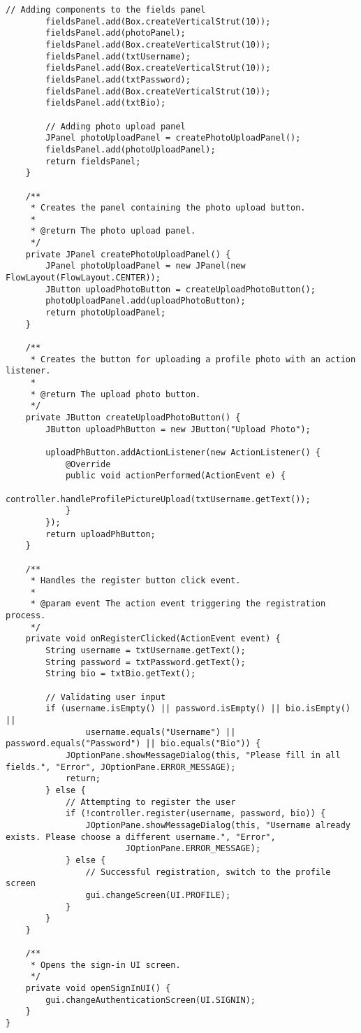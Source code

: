 \begin{lstlisting}[style=JavaStyle, caption={SignUpUI Class}, label={lst:SignUpUI-codesnippet}]
        // Adding components to the fields panel
        fieldsPanel.add(Box.createVerticalStrut(10));
        fieldsPanel.add(photoPanel);
        fieldsPanel.add(Box.createVerticalStrut(10));
        fieldsPanel.add(txtUsername);
        fieldsPanel.add(Box.createVerticalStrut(10));
        fieldsPanel.add(txtPassword);
        fieldsPanel.add(Box.createVerticalStrut(10));
        fieldsPanel.add(txtBio);

        // Adding photo upload panel
        JPanel photoUploadPanel = createPhotoUploadPanel();
        fieldsPanel.add(photoUploadPanel);
        return fieldsPanel;
    }

    /**
     * Creates the panel containing the photo upload button.
     *
     * @return The photo upload panel.
     */
    private JPanel createPhotoUploadPanel() {
        JPanel photoUploadPanel = new JPanel(new FlowLayout(FlowLayout.CENTER));
        JButton uploadPhotoButton = createUploadPhotoButton();
        photoUploadPanel.add(uploadPhotoButton);
        return photoUploadPanel;
    }

    /**
     * Creates the button for uploading a profile photo with an action listener.
     *
     * @return The upload photo button.
     */
    private JButton createUploadPhotoButton() {
        JButton uploadPhButton = new JButton("Upload Photo");

        uploadPhButton.addActionListener(new ActionListener() {
            @Override
            public void actionPerformed(ActionEvent e) {
                controller.handleProfilePictureUpload(txtUsername.getText());
            }
        });
        return uploadPhButton;
    }

    /**
     * Handles the register button click event.
     *
     * @param event The action event triggering the registration process.
     */
    private void onRegisterClicked(ActionEvent event) {
        String username = txtUsername.getText();
        String password = txtPassword.getText();
        String bio = txtBio.getText();

        // Validating user input
        if (username.isEmpty() || password.isEmpty() || bio.isEmpty() ||
                username.equals("Username") || password.equals("Password") || bio.equals("Bio")) {
            JOptionPane.showMessageDialog(this, "Please fill in all fields.", "Error", JOptionPane.ERROR_MESSAGE);
            return;
        } else {
            // Attempting to register the user
            if (!controller.register(username, password, bio)) {
                JOptionPane.showMessageDialog(this, "Username already exists. Please choose a different username.", "Error",
                        JOptionPane.ERROR_MESSAGE);
            } else {
                // Successful registration, switch to the profile screen
                gui.changeScreen(UI.PROFILE);
            }
        }
    }

    /**
     * Opens the sign-in UI screen.
     */
    private void openSignInUI() {
        gui.changeAuthenticationScreen(UI.SIGNIN);
    }
}

\end{lstlisting}

